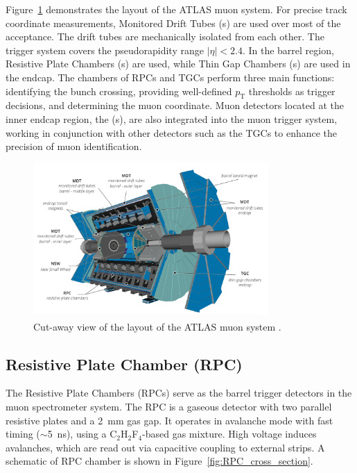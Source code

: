Figure~\ref{fig:muon_system} demonstrates the layout of the ATLAS muon system. For precise track coordinate measurements, Monitored Drift Tubes ({\MDT}s) are used over most of the acceptance. The drift tubes are mechanically isolated from each other. The trigger system covers the pseudorapidity range $|\eta| < 2.4$. In the barrel region, Resistive Plate Chambers ({\RPC}s) are used, while Thin Gap Chambers ({\TGC}s) are used in the endcap. The chambers of RPCs and TGCs perform three main functions: identifying the bunch crossing, providing well-defined $p_\mathrm{T}$ thresholds as trigger decisions, and determining the muon coordinate. Muon detectors located at the inner endcap region, the ({\NSW}s), are also integrated into the muon trigger system, working in conjunction with other detectors such as the TGCs to enhance the precision of muon identification.

\begin{figure}[htbp]
  \centering
  \includegraphics[width=0.8\textwidth]{figs/chapter2/muon_system.png}
  \caption{Cut-away view of the layout of the ATLAS muon system \cite{ATLASRun3Detector}.}
  \label{fig:muon_system}
\end{figure}

\subsection{Resistive Plate Chamber (RPC)}
The Resistive Plate Chambers (RPCs) serve as the barrel trigger detectors in the muon spectrometer system. The RPC is a gaseous detector with two parallel resistive plates and a 2~mm gas gap. It operates in avalanche mode with fast timing ($\sim$5~ns), using a C$_2$H$_2$F$_4$-based gas mixture. High voltage induces avalanches, which are read out via capacitive coupling to external strips. A schematic of RPC chamber is shown in Figure~\ref{fig:RPC_cross_section}.

